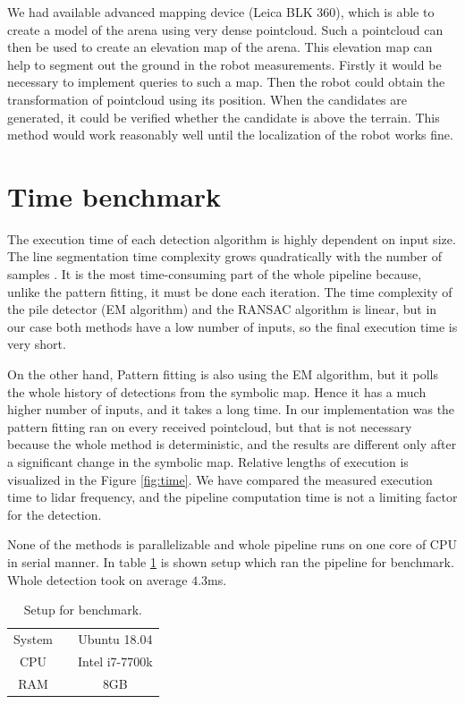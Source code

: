 We had available advanced mapping device (Leica BLK 360), which is able to create a model of the arena using very dense pointcloud. Such a pointcloud can then be used to create an elevation map of the arena. This elevation map can help to segment out the ground in the robot measurements. Firstly it would be necessary to implement queries to such a map. Then the robot could obtain the transformation of pointcloud using its position. When the candidates are generated, it could be verified whether the candidate is above the terrain. This method would work reasonably well until the localization of the robot works fine.

\section{Time benchmark}
The execution time of each detection algorithm is highly dependent on input size. The line segmentation time complexity grows quadratically with the number of samples \cite{hershberger2000}. It is the most time-consuming part of the whole pipeline because, unlike the pattern fitting, it must be done each iteration. The time complexity of the pile detector (EM algorithm) and the RANSAC algorithm is linear, but in our case both methods have a low number of inputs, so the final execution time is very short. 

On the other hand, Pattern fitting is also using the EM algorithm, but it polls the whole history of detections from the symbolic map. Hence it has a much higher number of inputs, and it takes a long time. In our implementation was the pattern fitting ran on every received pointcloud, but that is not necessary because the whole method is deterministic, and the results are different only after a significant change in the symbolic map. Relative lengths of execution is visualized in the Figure \ref{fig:time}. We have compared the measured execution time to lidar frequency, and the pipeline computation time is not a limiting factor for the detection.

None of the methods is parallelizable and whole pipeline runs on one core of CPU in serial manner. In table \ref{tab:benchmark} is shown setup which ran the pipeline for benchmark. Whole detection took on average $4.3$ms.

\begin{table}[H]
	\centering
	\caption{Setup for benchmark.}
	\begin{tabular}{ccc}
		\toprule
		System &\quad& Ubuntu 18.04 \\
		CPU &\quad& Intel i7-7700k  \\
		RAM &\quad& 8GB \\
		\bottomrule
	\end{tabular}
	\label{tab:benchmark}
\end{table}

